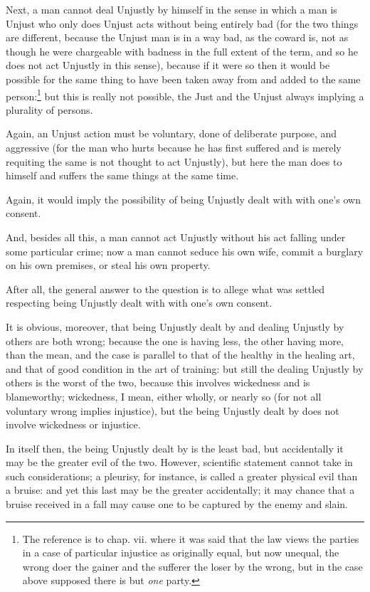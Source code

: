 Next, a man cannot deal Unjustly by himself in the sense in which a man is
Unjust who only does Unjust acts without being entirely bad (for the two things
are different, because the Unjust man is in a way bad, as the coward is, not as
though he were chargeable with badness in the full extent of the term, and so
he does not act Unjustly in this sense), because if it were so then it would be
possible for the same thing to have been taken away from and added to the same
person:\footnote{The reference is to chap. vii. where it was said that the law views the parties
in a case of particular injustice as originally equal, but now unequal, the
wrong doer the gainer and the sufferer the loser by the wrong, but in the case
above supposed there is but \emph{one} party.}
but this is really not possible, the Just and the Unjust always implying a
plurality of persons.

Again, an Unjust action must be voluntary, done of deliberate purpose, and
aggressive (for the man who hurts because he has first suffered and is merely
requiting the same is not thought to act Unjustly), but here the man does to
himself and suffers the same things at the same time.

Again, it would imply the possibility of being Unjustly dealt with with
one’s own consent.

And, besides all this, a man cannot act Unjustly without his act falling under
some particular crime; now a man cannot seduce his own wife, commit a burglary
on his own premises, or steal his own property.

After all, the general answer to the question is to allege what was settled
respecting being Unjustly dealt with with one’s own consent.


It is obvious, moreover, that being Unjustly dealt by and dealing Unjustly by
others are both wrong; because the one is having less, the other having more,
than the mean, and the case is parallel to that of the healthy in the healing
art, and that of good condition in the art of training: but still the dealing
Unjustly by others is the worst of the two, because this involves wickedness
and is blameworthy; wickedness, I mean, either wholly, or nearly so (for not
all voluntary wrong implies injustice), but the being Unjustly dealt by does
not involve wickedness or injustice.

In itself then, the being Unjustly dealt by is the least bad, but accidentally
it may be the greater evil of the two. However, scientific statement cannot
take in such considerations; a pleurisy, for instance, is called a greater
physical evil than a bruise: and yet this last may be the greater accidentally;
it may chance that a bruise received in a fall may cause one to be captured by
the enemy and slain.

